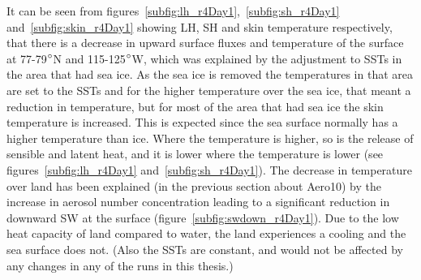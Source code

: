 It can be seen from figures~\ref{subfig:lh_r4Day1},~\ref{subfig:sh_r4Day1} and~\ref{subfig:skin_r4Day1} showing LH, SH and skin temperature respectively, that there is a decrease in upward surface fluxes and temperature of the surface at 77-79$\degree$N and 115-125$\degree$W, which was explained by the adjustment to SSTs in the area that had sea ice. As the sea ice is removed the temperatures in that area are set to the SSTs and for the higher temperature over the sea ice, that meant a reduction in temperature, but for most of the area that had sea ice the skin temperature is increased. This is expected since the sea surface normally has a higher temperature than ice. Where the temperature is higher, so is the release of sensible and latent heat, and it is lower where the temperature is lower (see figures~\ref{subfig:lh_r4Day1} and~\ref{subfig:sh_r4Day1}). The decrease in temperature over land has been explained (in the previous section about Aero10) by the increase in aerosol number concentration leading to a significant reduction in downward SW at the surface (figure~\ref{subfig:swdown_r4Day1}). Due to the low heat capacity of land compared to water, the land experiences a cooling and the sea surface does not. (Also the SSTs are constant, and would not be affected by any changes in any of the runs in this thesis.)


